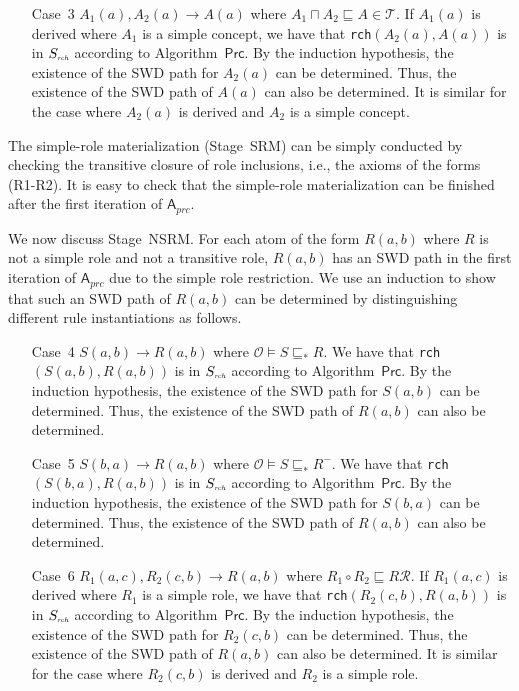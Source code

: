 \documentclass[final,1p,times]{elsarticle}
\begin{document}
\begin{enumerate}[leftmargin=12ex]
\item[Case~3] $A_1(a),A_2(a)\rightarrow A(a)$ where $A_1\sqcap A_2\sqsubseteq A\in\mathcal{T}$.
    If $A_1(a)$ is derived where $A_1$ is a simple concept,
    we have that \texttt{rch}$(A_2(a),A(a))$ is in $S_{\textit{\tiny rch}}$
    according to Algorithm~$\mathsf{Prc}$.
    By the induction hypothesis, the existence of the SWD path for $A_2(a)$ can be determined.
    Thus, the existence of the SWD path of $A(a)$ can also be determined.
    It is similar for the case where $A_2(a)$ is derived and $A_2$ is a simple concept.
\end{enumerate}

The simple-role materialization (Stage~SRM) can be simply conducted by checking the transitive closure
of role inclusions, i.e., the axioms of the forms (R1-R2).
It is easy to check that the simple-role materialization can be finished after the
first iteration of $\mathsf{A}_{prc}$.

We now discuss Stage~NSRM. For each atom of the form $R(a,b)$ where $R$ is not a simple role
and not a transitive role,
$R(a,b)$ has an SWD path in the first iteration of $\mathsf{A}_{prc}$ due to the simple role restriction.
We use an induction to show that
such an SWD path of $R(a,b)$ can be determined by distinguishing different rule instantiations
as follows.

\begin{enumerate}[leftmargin=12ex]
\item[Case~4] $S(a,b)\rightarrow R(a,b)$ where $\mathcal{O}\models S\sqsubseteq_* R$.
    We have that \texttt{rch}$(S(a,b),R(a,b))$ is in $S_{\textit{\tiny rch}}$
    according to Algorithm~$\mathsf{Prc}$.
    By the induction hypothesis, the existence of the SWD path for $S(a,b)$ can be determined.
    Thus, the existence of the SWD path of $R(a,b)$ can also be determined.

\item[Case~5] $S(b,a)\rightarrow R(a,b)$ where $\mathcal{O}\models S\sqsubseteq_* R^-$.
    We have that \texttt{rch}$(S(b,a),R(a,b))$ is in $S_{\textit{\tiny rch}}$
    according to Algorithm~$\mathsf{Prc}$.
    By the induction hypothesis, the existence of the SWD path for $S(b,a)$ can be determined.
    Thus, the existence of the SWD path of $R(a,b)$ can also be determined.

\item[Case~6] $R_1(a,c),R_2(c,b)\rightarrow R(a,b)$ where $R_1\circ R_2\sqsubseteq R\mathcal{R}$.
    If $R_1(a,c)$ is derived where $R_1$ is a simple role,
    we have that \texttt{rch}$(R_2(c,b),R(a,b))$ is in $S_{\textit{\tiny rch}}$
    according to Algorithm~$\mathsf{Prc}$.
    By the induction hypothesis, the existence of the SWD path for $R_2(c,b)$ can be determined.
    Thus, the existence of the SWD path of $R(a,b)$ can also be determined.
    It is similar for the case where $R_2(c,b)$ is derived and $R_2$ is a simple role.
\end{enumerate}
\end{document}
